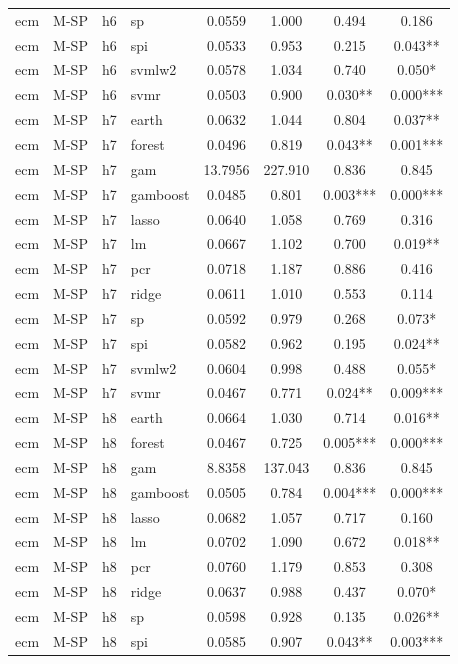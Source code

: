 \begin{ThreePartTable}
\begin{longtable}[t]{llclcccc}
ecm & M-SP & h6 & sp & 0.0559 & 1.000 & 0.494 & 0.186\\
ecm & M-SP & h6 & spi & 0.0533 & 0.953 & 0.215 & 0.043**\\
ecm & M-SP & h6 & svmlw2 & 0.0578 & 1.034 & 0.740 & 0.050*\\
ecm & M-SP & h6 & svmr & 0.0503 & 0.900 & 0.030** & 0.000***\\
\addlinespace
ecm & M-SP & h7 & earth & 0.0632 & 1.044 & 0.804 & 0.037**\\
ecm & M-SP & h7 & forest & 0.0496 & 0.819 & 0.043** & 0.001***\\
ecm & M-SP & h7 & gam & 13.7956 & 227.910 & 0.836 & 0.845\\
ecm & M-SP & h7 & gamboost & 0.0485 & 0.801 & 0.003*** & 0.000***\\
ecm & M-SP & h7 & lasso & 0.0640 & 1.058 & 0.769 & 0.316\\
ecm & M-SP & h7 & lm & 0.0667 & 1.102 & 0.700 & 0.019**\\
ecm & M-SP & h7 & pcr & 0.0718 & 1.187 & 0.886 & 0.416\\
ecm & M-SP & h7 & ridge & 0.0611 & 1.010 & 0.553 & 0.114\\
ecm & M-SP & h7 & sp & 0.0592 & 0.979 & 0.268 & 0.073*\\
ecm & M-SP & h7 & spi & 0.0582 & 0.962 & 0.195 & 0.024**\\
ecm & M-SP & h7 & svmlw2 & 0.0604 & 0.998 & 0.488 & 0.055*\\
ecm & M-SP & h7 & svmr & 0.0467 & 0.771 & 0.024** & 0.009***\\
\addlinespace
ecm & M-SP & h8 & earth & 0.0664 & 1.030 & 0.714 & 0.016**\\
ecm & M-SP & h8 & forest & 0.0467 & 0.725 & 0.005*** & 0.000***\\
ecm & M-SP & h8 & gam & 8.8358 & 137.043 & 0.836 & 0.845\\
ecm & M-SP & h8 & gamboost & 0.0505 & 0.784 & 0.004*** & 0.000***\\
ecm & M-SP & h8 & lasso & 0.0682 & 1.057 & 0.717 & 0.160\\
ecm & M-SP & h8 & lm & 0.0702 & 1.090 & 0.672 & 0.018**\\
ecm & M-SP & h8 & pcr & 0.0760 & 1.179 & 0.853 & 0.308\\
ecm & M-SP & h8 & ridge & 0.0637 & 0.988 & 0.437 & 0.070*\\
ecm & M-SP & h8 & sp & 0.0598 & 0.928 & 0.135 & 0.026**\\
ecm & M-SP & h8 & spi & 0.0585 & 0.907 & 0.043** & 0.003***\\

\end{longtable}
\end{ThreePartTable}

